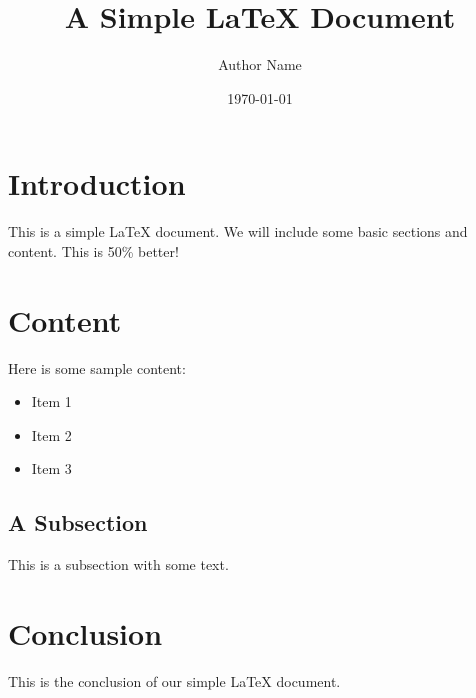 


\title{A Simple LaTeX Document} \author{Author Name} \date{\today}

\maketitle %

\section{Introduction} This is a simple LaTeX document. We will include some
basic sections and content. This is 50\% better!

\section{Content} Here is some sample content: \begin{itemize}
    \item Item 1
    \item Item 2
    \item Item 3
\end{itemize}

\subsection{A Subsection} This is a subsection with some text.

\section{Conclusion} This is the conclusion of our simple LaTeX document.



